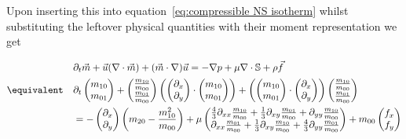 Upon inserting this into equation~\eqref{eq:compressible NS isotherm} whilst substituting the leftover physical quantities with their moment representation we get

\begin{equation*}
\begin{aligned}
  &\partial_t \vec{m} + \vec{u}(\nabla \cdot \vec{m}) + (\vec{m} \cdot \nabla)\vec{u}
    = - \nabla p + \mu \nabla \cdot \mathbb{S} + \rho \vec{f}\\
\equivalent \quad
&\partial_t \begin{pmatrix}m_{10} \\m_{01}  \end{pmatrix}
+ \begin{pmatrix}\frac{m_{10}}{m_{00}} \\\frac{m_{01}}{m_{00}}  \end{pmatrix}
\left(\begin{pmatrix}\partial_x \\\partial_y  \end{pmatrix} \cdot \begin{pmatrix}m_{10} \\m_{01}  \end{pmatrix}\right)
+ \left(\begin{pmatrix}m_{10} \\m_{01}  \end{pmatrix} \cdot \begin{pmatrix}\partial_x \\\partial_y  \end{pmatrix}\right)
\begin{pmatrix}\frac{m_{10}}{m_{00}} \\\frac{m_{01}}{m_{00}}  \end{pmatrix}
\\&= - \begin{pmatrix}\partial_x \\\partial_y  \end{pmatrix} \left(m_{20} - \frac{ m_{10}^2 }{ m_{00} } \right)
+ \mu
\begin{pmatrix}
    \frac{4}{3}\partial_{xx} \frac{m_{10}}{m_{00}} + \frac{1}{3}\partial_{xy} \frac{m_{01}}{m_{00}} + \partial_{yy} \frac{m_{10}}{m_{00}} \\
    \partial_{xx} \frac{m_{01}}{m_{00}} +\frac{1}{3}\partial_{xy} \frac{m_{10}}{m_{00}} + \frac{4}{3}\partial_{yy} \frac{m_{01}}{m_{00}}
  \end{pmatrix} + m_{00} \begin{pmatrix}f_x\\f_y \end{pmatrix}

\end{aligned}
\end{equation*}
